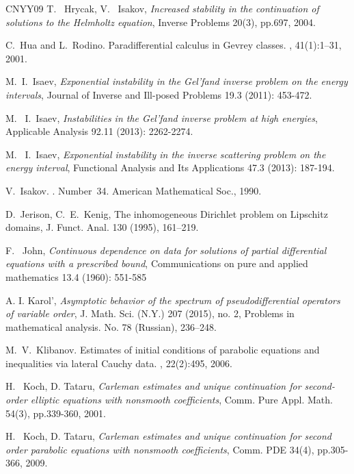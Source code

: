 \documentclass[12pt,twoside]{amsart}
\numberwithin{equation}{section}
\begin{document}
\begin{thebibliography}{CNYY09}
T. \ Hrycak, V. \ Isakov, \textit{{Increased stability in the continuation of solutions to the Helmholtz equation}}, Inverse Problems 20(3), pp.697, 2004.

C.\ Hua and L.\ Rodino.
\newblock Paradifferential calculus in {G}evrey classes.
, 41(1):1--31, 2001.



M.\ I.\ Isaev, \textit{Exponential instability in the Gel'fand inverse problem on the energy intervals}, Journal of Inverse and Ill-posed Problems 19.3 (2011): 453-472.

M. \ I.\ Isaev, \textit{Instabilities in the Gel'fand inverse problem at high energies}, Applicable Analysis 92.11 (2013): 2262-2274.

M. \ I.\ Isaev, \textit{Exponential instability in the inverse scattering problem on the energy interval}, Functional Analysis and Its Applications 47.3 (2013): 187-194.

V.\ Isakov.
.
\newblock Number~34. American Mathematical Soc., 1990.

D.\ Jerison, C.\ E.\ Kenig, The inhomogeneous Dirichlet problem on Lipschitz domains, J. Funct. Anal. 130 (1995), 161--219.

F. \ John, \textit{Continuous dependence on data for solutions of partial differential equations with a prescribed bound},
Communications on pure and applied mathematics 13.4 (1960): 551-585

A. I. Karol', \textit{{Asymptotic behavior of the spectrum of pseudodifferential operators of variable order}}, J. Math. Sci. (N.Y.) 207 (2015), no. 2, Problems in mathematical analysis. No. 78 (Russian), 236--248.

M.\ V.\ Klibanov.
\newblock Estimates of initial conditions of parabolic equations and
  inequalities via lateral {C}auchy data.
, 22(2):495, 2006.


H. \ Koch, D. Tataru, \textit{{Carleman estimates and unique continuation for second-order elliptic equations with nonsmooth coefficients}}, Comm. Pure Appl. Math. 54(3), pp.339-360, 2001.

H. \ Koch, D. Tataru, \textit{{Carleman estimates and unique continuation for second order parabolic equations with nonsmooth coefficients}}, Comm. PDE 34(4), pp.305-366, 2009.



\end{thebibliography}
\end{document}
